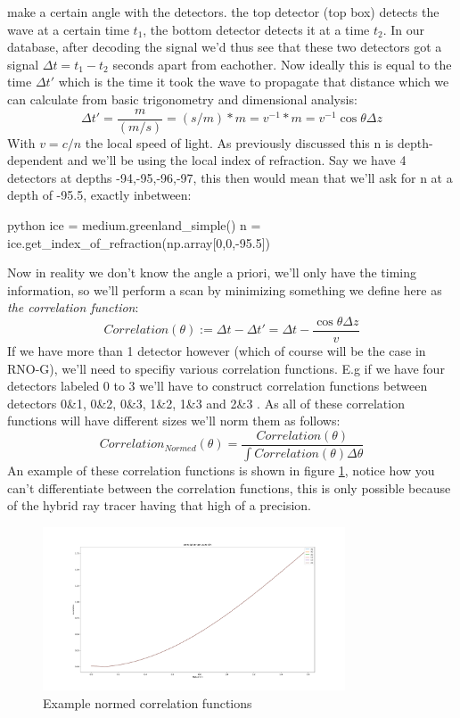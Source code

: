 \documentclass[11pt,a4paper,faculty=we,language=en,doctype=report]{cls/ugent-doc}
\begin{document}
make a certain angle with the detectors. the top detector (top box)
detects the wave at a certain time $t_1$, the bottom detector
detects it at a time $t_2$. In our database, after decoding the
signal we'd thus see that these two detectors got a signal $\Delta t
= t_1 - t_2$ seconds apart from eachother. Now ideally this is
equal to the time $\Delta t'$ which is the time it took the wave
to propagate that distance which we can calculate from 
basic trigonometry and dimensional analysis:
\begin{equation}
	\Delta t' = \frac{m}{(m/s)} = (s/m)*m = v^{-1} * m = v^{-1} \cos\theta \Delta z
\end{equation}
With $v = c/n$ the local speed of light. As previously discussed
this n is depth-dependent and we'll be using the local index of
refraction. Say we have 4 detectors at depths -94,-95,-96,-97,
this then would mean that we'll ask for n at a depth of -95.5, exactly inbetween:
\begin{mintedbox}{python}
ice = medium.greenland_simple()
n = ice.get_index_of_refraction(np.array[0,0,-95.5])
\end{mintedbox}
Now in reality we don't know the angle a priori, we'll only have the timing
information, so we'll perform a scan by minimizing something we define here as 
\textit{the correlation function}:
\begin{equation}
	Correlation(\theta) := \Delta t - \Delta t' = \Delta t
	- \frac{\cos\theta \Delta z}{v}
  \label{eqn:PlaneWave}
\end{equation}
If we have more than 1 detector however (which of course will be the case in RNO-G),
we'll need to specifiy various correlation functions.
E.g if we have four detectors labeled 0 to 3 we'll have to construct
correlation functions between detectors 0\&1, 0\&2, 0\&3, 1\&2, 1\&3 and 2\&3 .
As all of these correlation functions will have different
sizes we'll norm them as follows:
\begin{equation}
	Correlation_{Normed}(\theta) =
	\frac{Correlation(\theta)}{\int Correlation(\theta)\Delta
	\theta}
\end{equation}
An example of these correlation functions is shown in figure \ref{fig:NormedCorrelation}, 
notice how you can't differentiate between the correlation functions, this is only possible
because of the hybrid ray tracer having that high of a precision.
\begin{figure}
	\centering
	\includegraphics[width=0.8\textwidth]{NormedCorrelation.pdf}
	\caption{Example normed correlation functions}
	\label{fig:NormedCorrelation}
\end{figure}
\end{document}
